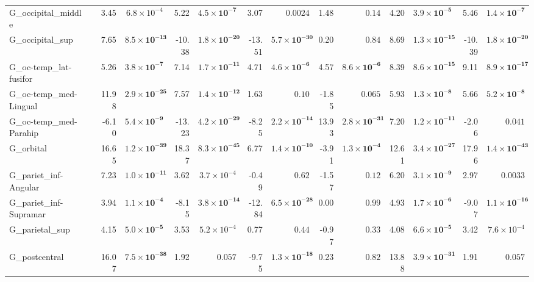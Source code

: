 {\begin{longtable}{llrrrrrrrrrrrr}
G\_occipital\_middle &  & 3.45 & $6.8{\times}10^{-4}$ & 5.22 & $\mathbf{4.5{\times}10^{-7}}$ & 3.07 & $0.0024$ & 1.48 & $0.14$ & 4.20 & $\mathbf{3.9{\times}10^{-5}}$ & 5.46 & $\mathbf{1.4{\times}10^{-7}}$ \\
G\_occipital\_sup &  & 7.65 & $\mathbf{8.5{\times}10^{-13}}$ & -10.38 & $\mathbf{1.8{\times}10^{-20}}$ & -13.51 & $\mathbf{5.7{\times}10^{-30}}$ & 0.20 & $0.84$ & 8.69 & $\mathbf{1.3{\times}10^{-15}}$ & -10.39 & $\mathbf{1.8{\times}10^{-20}}$ \\
G\_oc-temp\_lat-fusifor &  & 5.26 & $\mathbf{3.8{\times}10^{-7}}$ & 7.14 & $\mathbf{1.7{\times}10^{-11}}$ & 4.71 & $\mathbf{4.6{\times}10^{-6}}$ & 4.57 & $\mathbf{8.6{\times}10^{-6}}$ & 8.39 & $\mathbf{8.6{\times}10^{-15}}$ & 9.11 & $\mathbf{8.9{\times}10^{-17}}$ \\
G\_oc-temp\_med-Lingual &  & 11.98 & $\mathbf{2.9{\times}10^{-25}}$ & 7.57 & $\mathbf{1.4{\times}10^{-12}}$ & 1.63 & $0.10$ & -1.85 & $0.065$ & 5.93 & $\mathbf{1.3{\times}10^{-8}}$ & 5.66 & $\mathbf{5.2{\times}10^{-8}}$ \\
G\_oc-temp\_med-Parahip &  & -6.10 & $\mathbf{5.4{\times}10^{-9}}$ & -13.23 & $\mathbf{4.2{\times}10^{-29}}$ & -8.25 & $\mathbf{2.2{\times}10^{-14}}$ & 13.93 & $\mathbf{2.8{\times}10^{-31}}$ & 7.20 & $\mathbf{1.2{\times}10^{-11}}$ & -2.06 & $0.041$ \\
G\_orbital &  & 16.65 & $\mathbf{1.2{\times}10^{-39}}$ & 18.37 & $\mathbf{8.3{\times}10^{-45}}$ & 6.77 & $\mathbf{1.4{\times}10^{-10}}$ & -3.91 & $\mathbf{1.3{\times}10^{-4}}$ & 12.61 & $\mathbf{3.4{\times}10^{-27}}$ & 17.96 & $\mathbf{1.4{\times}10^{-43}}$ \\
G\_pariet\_inf-Angular &  & 7.23 & $\mathbf{1.0{\times}10^{-11}}$ & 3.62 & $3.7{\times}10^{-4}$ & -0.49 & $0.62$ & -1.57 & $0.12$ & 6.20 & $\mathbf{3.1{\times}10^{-9}}$ & 2.97 & $0.0033$ \\
G\_pariet\_inf-Supramar &  & 3.94 & $\mathbf{1.1{\times}10^{-4}}$ & -8.15 & $\mathbf{3.8{\times}10^{-14}}$ & -12.84 & $\mathbf{6.5{\times}10^{-28}}$ & 0.00 & $0.99$ & 4.93 & $\mathbf{1.7{\times}10^{-6}}$ & -9.07 & $\mathbf{1.1{\times}10^{-16}}$ \\
G\_parietal\_sup &  & 4.15 & $\mathbf{5.0{\times}10^{-5}}$ & 3.53 & $5.2{\times}10^{-4}$ & 0.77 & $0.44$ & -0.97 & $0.33$ & 4.08 & $\mathbf{6.6{\times}10^{-5}}$ & 3.42 & $7.6{\times}10^{-4}$ \\
G\_postcentral &  & 16.07 & $\mathbf{7.5{\times}10^{-38}}$ & 1.92 & $0.057$ & -9.75 & $\mathbf{1.3{\times}10^{-18}}$ & 0.23 & $0.82$ & 13.88 & $\mathbf{3.9{\times}10^{-31}}$ & 1.91 & $0.057$ \\

\end{longtable}}
